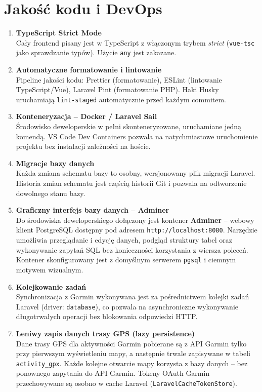 \documentclass[12pt,a4paper]{report}
\begin{document}
\section{Jakość kodu i DevOps}

\begin{enumerate}[resume]

\item \textbf{TypeScript Strict Mode} \\
Cały frontend pisany jest w TypeScript z włączonym trybem \textit{strict} (\texttt{vue-tsc} jako sprawdzanie typów). Użycie \texttt{any} jest zakazane.

\item \textbf{Automatyczne formatowanie i lintowanie} \\
Pipeline jakości kodu: Prettier (formatowanie), ESLint (lintowanie TypeScript/Vue), Laravel Pint (formatowanie PHP). Haki Husky uruchamiają \texttt{lint-staged} automatycznie przed każdym commitem.

\item \textbf{Konteneryzacja -- Docker / Laravel Sail} \\
Środowisko deweloperskie w pełni skonteneryzowane, uruchamiane jedną komendą. VS Code Dev Containers pozwala na natychmiastowe uruchomienie projektu bez instalacji zależności na hoście.

\item \textbf{Migracje bazy danych} \\
Każda zmiana schematu bazy to osobny, wersjonowany plik migracji Laravel. Historia zmian schematu jest częścią historii Git i pozwala na odtworzenie dowolnego stanu bazy.

\item \textbf{Graficzny interfejs bazy danych -- Adminer} \\
Do środowiska deweloperskiego dołączony jest kontener \textbf{Adminer} -- webowy klient PostgreSQL dostępny pod adresem \texttt{http://localhost:8080}. Narzędzie umożliwia przeglądanie i edycję danych, podgląd struktury tabel oraz wykonywanie zapytań SQL bez konieczności korzystania z wiersza poleceń. Kontener skonfigurowany jest z domyślnym serwerem \texttt{pgsql} i ciemnym motywem wizualnym.

\item \textbf{Kolejkowanie zadań} \\
Synchronizacja z Garmin wykonywana jest za pośrednictwem kolejki zadań Laravel (driver: \texttt{database}), co pozwala na asynchroniczne wykonywanie długotrwałych operacji bez blokowania odpowiedzi HTTP.

\item \textbf{Leniwy zapis danych trasy GPS (lazy persistence)} \\
Dane trasy GPS dla aktywności Garmin pobierane są z API Garmin tylko przy pierwszym wyświetleniu mapy, a następnie trwale zapisywane w tabeli \texttt{activity\_gpx}. Każde kolejne otwarcie mapy korzysta z bazy danych -- bez ponownego zapytania do API Garmin. Tokeny OAuth Garmin przechowywane są osobno w cache Laravel (\texttt{LaravelCacheTokenStore}).

\end{enumerate}
\end{document}
